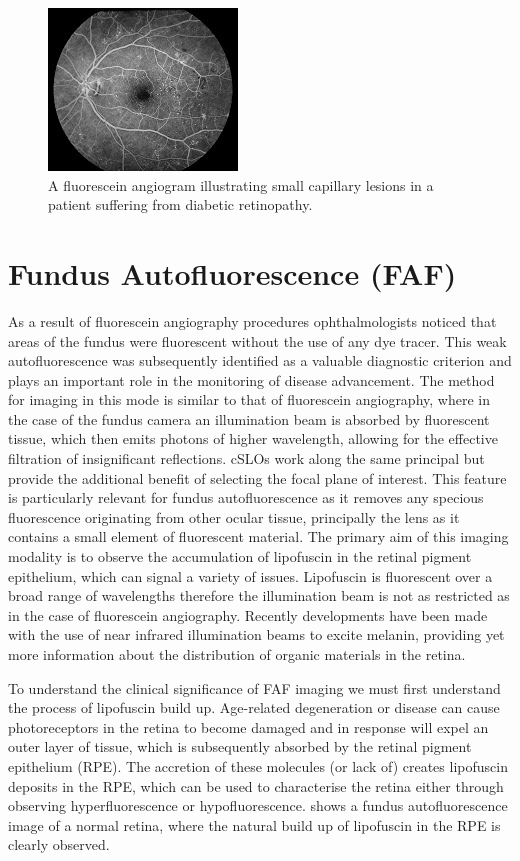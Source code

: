 \begin{figure}[htbp]
\centering
\includegraphics{figures/fadiabetic}
\caption{A fluorescein angiogram illustrating small capillary lesions in a patient suffering from diabetic retinopathy.}
\label{fig:fluordr}
   \end{figure}

\section{Fundus Autofluorescence (FAF)}

As a result of fluorescein angiography procedures ophthalmologists noticed
that areas of the fundus were fluorescent without the use of any dye tracer.
This weak autofluorescence was subsequently identified as a valuable diagnostic
criterion and plays an important role in the monitoring of disease advancement.
The method for imaging in this mode is similar to that of fluorescein angiography,
where in the case of the fundus camera an illumination beam is absorbed by
fluorescent tissue, which then emits photons of higher wavelength, allowing
for the effective filtration of insignificant reflections. cSLOs work along
the same principal but provide the additional benefit of selecting the focal
plane of interest.\cite{schmitz2008fundus} This feature is particularly relevant
for fundus autofluorescence as it removes any specious fluorescence originating
from other ocular tissue, principally the lens as it contains a small element of
fluorescent material. \cite{von1995distribution} The primary aim of this imaging
modality is to observe the accumulation of lipofuscin in the retinal pigment
epithelium, which can signal a variety of issues. Lipofuscin is fluorescent over
a broad range of wavelengths therefore the illumination beam is not as restricted
as in the case of fluorescein angiography. Recently developments have been made
with the use of near infrared illumination beams to excite melanin, providing
yet more information about the distribution of organic materials in the retina.

To understand the clinical significance of FAF imaging we must first understand
the process of lipofuscin build up.\cite{kennedy1995lipofuscin} Age-related
degeneration or disease can cause photoreceptors in the retina to become
damaged and in response will expel an outer layer of tissue, which is
subsequently absorbed by the retinal pigment epithelium (RPE).\cite{spaide2003fundus}
The accretion of these molecules (or lack of) creates lipofuscin deposits
in the RPE, which can be used to characterise the retina either through
observing hyperfluorescence or hypofluorescence. shows a
fundus autofluorescence image of a normal retina, where the natural
build up of lipofuscin in the RPE is clearly observed.

